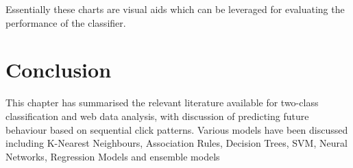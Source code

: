Essentially these charts are visual aids which can be leveraged for evaluating the performance of the classifier. 

\section{Conclusion}\label{sotaConc}
This chapter has summarised the relevant literature available for two-class classification and web data analysis, with discussion of predicting future behaviour based on sequential click patterns. Various models have been discussed including K-Nearest Neighbours, Association Rules, Decision Trees, SVM, Neural Networks, Regression Models and ensemble models

